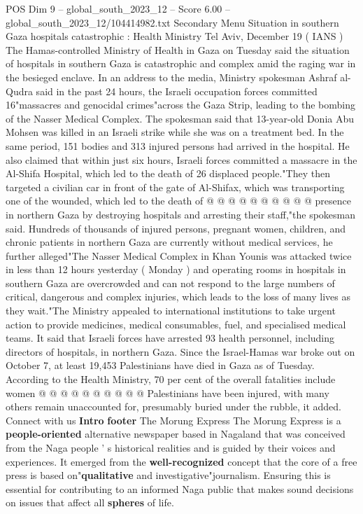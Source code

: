 \begin{textsample}{POS Dim 9 – global\_south\_2023\_12 – Score 6.00 – global\_south\_2023\_12/104414982.txt}  \label{ex:f9_pos_009}
Secondary Menu Situation in southern Gaza hospitals catastrophic : Health Ministry Tel Aviv, December 19 ( IANS ) The Hamas-controlled Ministry of Health in Gaza on Tuesday said the situation of hospitals in southern Gaza is catastrophic and complex amid the raging war in the besieged enclave.
In an address to the media, Ministry spokesman Ashraf al-Qudra said in the past 24 hours, the Israeli occupation forces committed 16"massacres and genocidal crimes"across the Gaza Strip, leading to the bombing of the Nasser Medical Complex.
The spokesman said that 13-year-old Donia Abu Mohsen was killed in an Israeli strike while she was on a treatment bed.
In the same period, 151 bodies and 313 injured persons had arrived in the hospital.
He also claimed that within just six hours, Israeli forces committed a massacre in the Al-Shifa Hospital, which led to the death of 26 displaced people."They then targeted a civilian car in front of the gate of Al-Shifax, which was transporting one of the wounded, which led to the death of @ @ @ @ @ @ @ @ @ @ presence in northern Gaza by destroying hospitals and arresting their staff,"the spokesman said.
Hundreds of thousands of injured persons, pregnant women, children, and chronic patients in northern Gaza are currently without medical services, he further alleged"The Nasser Medical Complex in Khan Younis was attacked twice in less than 12 hours yesterday ( Monday ) and operating rooms in hospitals in southern Gaza are overcrowded and can not respond to the large numbers of critical, dangerous and complex injuries, which leads to the loss of many lives as they wait."The Ministry appealed to international institutions to take urgent action to provide medicines, medical consumables, fuel, and specialised medical teams.
It said that Israeli forces have arrested 93 health personnel, including directors of hospitals, in northern Gaza.
Since the Israel-Hamas war broke out on October 7, at least 19,453 Palestinians have died in Gaza as of Tuesday.
According to the Health Ministry, 70 per cent of the overall fatalities include women @ @ @ @ @ @ @ @ @ @ Palestinians have been injured, with many others remain unaccounted for, presumably buried under the rubble, it added.
Connect with us \textbf{Intro} \textbf{footer} The Morung Express The Morung Express is a \textbf{people-oriented} alternative newspaper based in Nagaland that was conceived from the Naga people ' s historical realities and is guided by their voices and experiences.
It emerged from the \textbf{well-recognized} concept that the core of a free press is based on"\textbf{qualitative} and investigative"journalism.
Ensuring this is essential for contributing to an informed Naga public that makes sound decisions on issues that affect all \textbf{spheres} of life.

\end{textsample}
